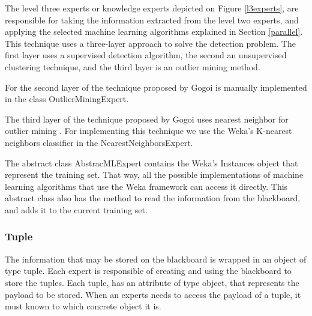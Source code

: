 


The level three experts or knowledge experts depicted on Figure \ref{l3experts}, are responsible for taking the information extracted from the level two experts, and applying the selected machine learning algorithms explained in Section \ref{parallel}. This technique uses a three-layer approach to solve the detection problem. The first layer uses a supervised detection algorithm, the second an unsupervised clustering technique, and the third layer is an outlier mining method.

For the second layer of the technique proposed by Gogoi \etAl \cite{Gogoi01042014} is manually implemented in the class OutlierMiningExpert.

The third layer of the technique proposed by Gogoi \etAl uses nearest neighbor for outlier mining \cite{Gogoi01042014}. For implementing this technique we use the Weka's K-nearest neighbors classifier \cite{ibk} in the NearestNeighborsExpert.

The abstract class AbstracMLExpert contains the Weka's Instances object that represent the training set. That way, all the possible implementations of machine learning algorithms that use the Weka framework can access it directly. This abstract class also has the method to read the information from the blackboard, and adds it to the current training set.



\subsubsection{Tuple}
The information that may be stored on the blackboard is wrapped in an object of type tuple. Each expert is responsible of creating and using the blackboard to store the tuples. Each tuple, has an attribute of type object, that represents the payload to be stored. When an experts needs to access the payload of a tuple, it must known to which concrete object it is.

